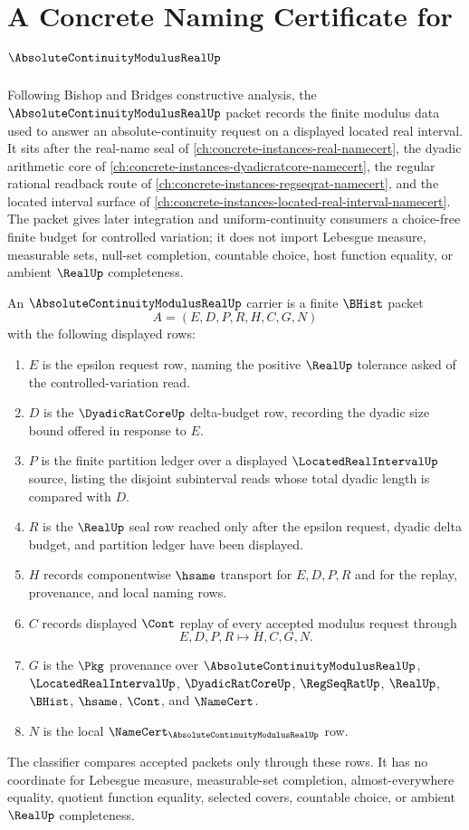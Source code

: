 \chapter{A Concrete Naming Certificate for $\AbsoluteContinuityModulusRealUp$}
\label{ch:concrete-instances-absolute-continuity-modulus-real-namecert}

Following Bishop and Bridges constructive analysis, the $\AbsoluteContinuityModulusRealUp$ packet records the finite modulus data used to answer an absolute-continuity request on a displayed located real interval. It sits after the real-name seal of \autoref{ch:concrete-instances-real-namecert}, the dyadic arithmetic core of \autoref{ch:concrete-instances-dyadicratcore-namecert}, the regular rational readback route of \autoref{ch:concrete-instances-regseqrat-namecert}, and the located interval surface of \autoref{ch:concrete-instances-located-real-interval-namecert}. The packet gives later integration and uniform-continuity consumers a choice-free finite budget for controlled variation; it does not import Lebesgue measure, measurable sets, null-set completion, countable choice, host function equality, or ambient $\RealUp$ completeness.

\begin{definition}
\label{def:absolute-continuity-modulus-real-carrier}
An $\AbsoluteContinuityModulusRealUp$ carrier is a finite $\BHist$ packet
$$
A=(E,D,P,R,H,C,G,N)
$$
with the following displayed rows:
\begin{enumerate}
\item $E$ is the epsilon request row, naming the positive $\RealUp$ tolerance asked of the controlled-variation read.
\item $D$ is the $\DyadicRatCoreUp$ delta-budget row, recording the dyadic size bound offered in response to $E$.
\item $P$ is the finite partition ledger over a displayed $\LocatedRealIntervalUp$ source, listing the disjoint subinterval reads whose total dyadic length is compared with $D$.
\item $R$ is the $\RealUp$ seal row reached only after the epsilon request, dyadic delta budget, and partition ledger have been displayed.
\item $H$ records componentwise $\hsame$ transport for $E,D,P,R$ and for the replay, provenance, and local naming rows.
\item $C$ records displayed $\Cont$ replay of every accepted modulus request through
$$
E,D,P,R \longmapsto H,C,G,N .
$$
\item $G$ is the $\Pkg$ provenance over $\AbsoluteContinuityModulusRealUp$, $\LocatedRealIntervalUp$, $\DyadicRatCoreUp$, $\RegSeqRatUp$, $\RealUp$, $\BHist$, $\hsame$, $\Cont$, and $\NameCert$.
\item $N$ is the local $\NameCert_{\AbsoluteContinuityModulusRealUp}$ row.
\end{enumerate}
The classifier compares accepted packets only through these rows. It has no coordinate for Lebesgue measure, measurable-set completion, almost-everywhere equality, quotient function equality, selected covers, countable choice, or ambient $\RealUp$ completeness.
\end{definition}

